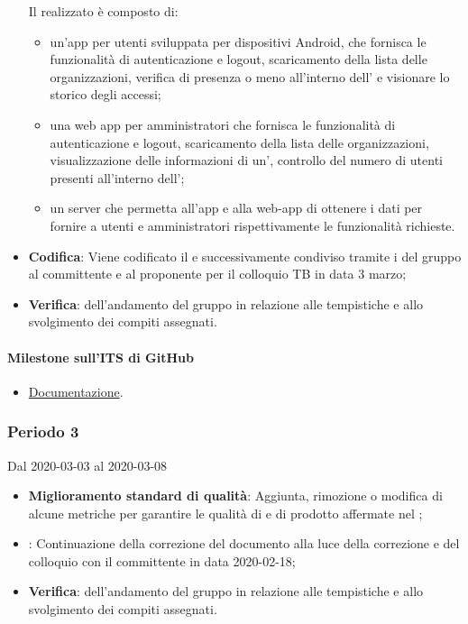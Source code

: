 \begin{itemize}
	Il  realizzato è composto di:
	\begin{itemize}
		\item un'app per utenti sviluppata per dispositivi Android, che fornisca le funzionalità di autenticazione e logout, scaricamento della lista delle organizzazioni, verifica di presenza o meno all'interno dell' e visionare lo storico degli accessi;
		\item una web app per amministratori che fornisca le funzionalità di autenticazione e logout, scaricamento della lista delle organizzazioni, visualizzazione delle informazioni di un', controllo del numero di utenti presenti all'interno dell';
		\item un server che permetta all'app e alla web-app di ottenere i dati per fornire a utenti e amministratori rispettivamente le funzionalità richieste.
	\end{itemize}
	\item \textbf{Codifica}: Viene codificato il  e successivamente condiviso tramite i  del gruppo al committente e al proponente per il colloquio TB in data 3 marzo;
	\item \textbf{Verifica}:  dell'andamento del gruppo in relazione alle tempistiche e allo svolgimento dei compiti assegnati.
\end{itemize}
\paragraph{Milestone sull'ITS di GitHub}
\begin{itemize}
	\item \href{https://github.com/qb-team/Stalker-Documentazione/milestone/9}{Documentazione}.
\end{itemize}

\subsubsection{Periodo 3} 
Dal 2020-03-03 al 2020-03-08
\begin{itemize}
	\item \textbf{Miglioramento standard di qualità}: Aggiunta, rimozione o modifica di alcune metriche per garantire le qualità di  e di prodotto affermate nel \PdQ{};
	\item \textbf{\AdR{}}: Continuazione della correzione del documento alla luce della correzione e del colloquio con il committente in data 2020-02-18;
	\item \textbf{Verifica}:  dell'andamento del gruppo in relazione alle tempistiche e allo svolgimento dei compiti assegnati.
\end{itemize}

